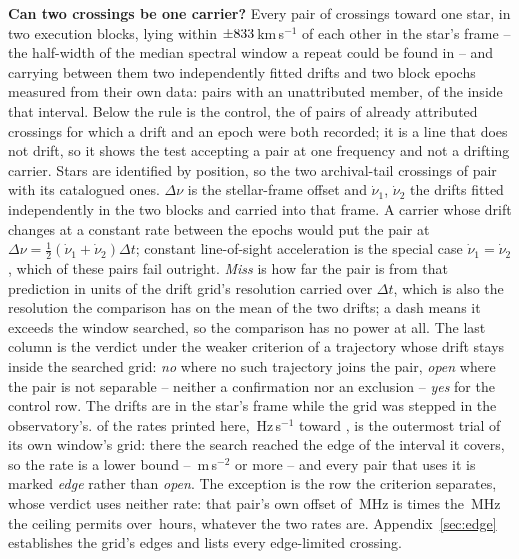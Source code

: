 \begin{table}
\centering
\caption{\textbf{Can two crossings be one carrier?} Every pair of crossings
toward one star, in two execution blocks, lying within
$\pm\WdHalfKms$\,km\,s$^{-1}$ of each other in the star's frame -- the
half-width of the median spectral window a repeat could be found in -- and
carrying between them two independently fitted drifts and two block epochs
measured from their own data: \TjNPair{} pairs with an unattributed member,
of the \TjNCandPair{} inside that interval. Below the rule is the control, the
\TjNCandAttrTest{} of \TjNCandAttr{} pairs of already attributed crossings for
which a drift and an epoch were both recorded; it is a line that does not
drift, so it shows the test accepting a pair at one frequency and not a
drifting carrier. Stars are
identified by position, so the two archival-tail crossings of \TjDeepStar{}
pair with its catalogued ones. $\Delta\nu$ is the stellar-frame offset and
$\dot\nu_1$, $\dot\nu_2$ the drifts fitted independently in the two blocks
and carried into that frame. A carrier whose drift changes at a constant rate
between the epochs would put the pair at
$\Delta\nu=\frac{1}{2}(\dot\nu_1+\dot\nu_2)\Delta t$; constant
line-of-sight acceleration is the special case $\dot\nu_1=\dot\nu_2$, which
\TjNUneqDrift{} of these pairs fail outright. \emph{Miss} is how
far the pair is from that prediction in units of the drift grid's resolution
carried over $\Delta t$, which is also the resolution the comparison has on
the mean of the two drifts; a dash means it exceeds the window searched, so the
comparison has no power at all. The last column is the verdict under the weaker
criterion of a trajectory whose drift stays inside the searched grid:
\emph{no} where no such trajectory joins the pair, \emph{open} where the pair
is not separable -- neither a confirmation nor an exclusion --
\emph{yes} for the control row. The drifts are in the star's frame while the
grid was stepped in the observatory's. \EgNPairDriftEdge{} of the rates
printed here, \EgStarDriftHzS\,Hz\,s$^{-1}$ toward \EgStarALosHiStar, is the
outermost trial of its own window's grid: there the search reached the edge
of the interval it covers, so the rate is a lower bound --
\EgStarALosHi\,m\,s$^{-2}$ or more -- and every pair that uses it is marked
\emph{edge} rather than \emph{open}. The exception is the row the criterion
separates, whose verdict uses neither rate: that pair's own offset of
\EgExclOffMHz\,MHz is \EgExclFac{} times the \EgExclReachMHz\,MHz the
ceiling permits over \EgExclDtH\,hours, whatever the two rates are.
Appendix~\ref{sec:edge} establishes the grid's edges and lists every
edge-limited crossing.}
\label{tab:pairs}
\scriptsize

\end{table}

